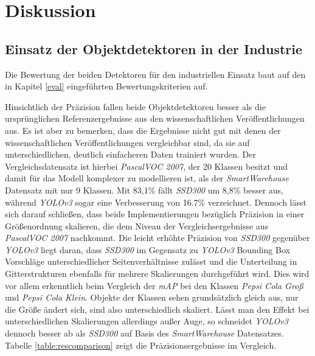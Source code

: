 \chapter{Diskussion}

\section{Einsatz der Objektdetektoren in der Industrie}

Die Bewertung der beiden Detektoren für den industriellen Einsatz baut auf den in Kapitel \ref{eval} eingeführten Bewertungskriterien auf. 

Hinsichtlich der Präzision fallen beide Objektdetektoren besser als die ursprünglichen Referenzergebnisse aus den wissenschaftlichen Veröffentlichungen aus. Es ist aber zu bemerken, dass die Ergebnisse nicht gut mit denen der wissenschaftlichen Veröffentlichungen vergleichbar sind, da sie auf unterschiedlichen, deutlich einfacheren Daten trainiert wurden. Der Vergleichsdatensatz ist hierbei \textit{PascalVOC 2007}, der 20 Klassen besitzt und damit für das Modell komplexer zu modellieren ist, als der \textit{SmartWarehouse} Datensatz mit nur 9 Klassen. Mit 83,1\% fällt \textit{SSD300} um 8,8\% besser aus, während \textit{YOLOv3} sogar eine Verbesserung von 16.7\% verzeichnet. Dennoch lässt sich darauf schließen, dass beide Implementierungen bezüglich Präzision in einer Größenordnung skalieren, die dem Niveau der Vergleichsergebnisse aus \textit{PascalVOC 2007} nachkommt. Die leicht erhöhte Präzision von \textit{SSD300} gegenüber \textit{YOLOv3} liegt daran, dass \textit{SSD300} im Gegensatz zu \textit{YOLOv3} Bounding Box Vorschläge unterschiedlicher Seitenverhältnisse zulässt und die Unterteilung in Gitterstrukturen ebenfalls für mehrere Skalierungen durchgeführt wird. Dies wird vor allem erkenntlich beim Vergleich der \textit{mAP} bei den Klassen \textit{Pepsi Cola Groß} und \textit{Pepsi Cola Klein}. Objekte der Klassen sehen grundsätzlich gleich aus, nur die Größe ändert sich, sind also unterschiedlich skaliert. Lässt man den Effekt bei unterschiedlichen Skalierungen allerdings außer Auge, so schneidet \textit{YOLOv3} dennoch besser ab als \textit{SSD300} auf Basis des \textit{SmartWarehouse} Datensatzes. Tabelle \ref{table:rescomparison} zeigt die Präzisionsergebnisse im Vergleich.

